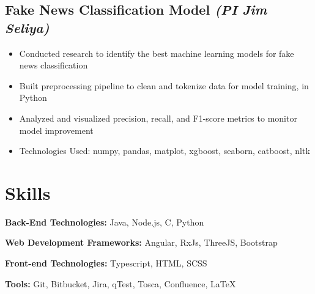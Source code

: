 \documentclass[a4paper,10pt]{article}
\begin{document}
\subsection*{{Fake News Classification Model}  \normalsize \textit{(PI Jim Seliya)}} 
{\fontsize{12}{15}\selectfont
\begin{itemize}[leftmargin=30pt]
    \item Conducted research to identify the best machine learning models for fake news classification
    \item Built preprocessing pipeline to clean and tokenize data for model training, in Python
    \item Analyzed and visualized precision, recall, and F1-score metrics to monitor model improvement
    \item Technologies Used: numpy, pandas, matplot, xgboost, seaborn, catboost, nltk
\end{itemize}
}
\section*{Skills}
\begin{itemize}[leftmargin=20pt, itemsep=0.2em] %
{\fontsize{12}{15}\selectfont
    \item \textbf{Back-End Technologies:} Java, Node.js, C, Python
    \item \textbf{Web Development Frameworks:} Angular, RxJs, ThreeJS, Bootstrap
    \item \textbf{Front-end Technologies:} Typescript, HTML, SCSS
    \item \textbf{Tools:} Git, Bitbucket, Jira, qTest, Tosca, Confluence, LaTeX
}
\end{itemize}
\end{document}
